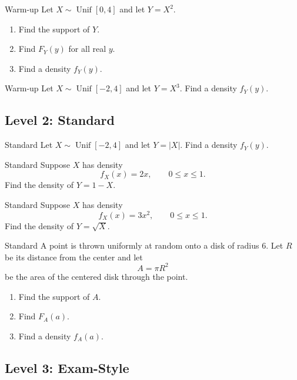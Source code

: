 \documentclass[12pt]{article}
\newcommand{\Unif}{\operatorname{Unif}}
\newcommand{\writespace}[1]{\vspace*{#1}}
\newcommand{\medws}{\writespace{1.8cm}}
\newcommand{\longws}{\writespace{2.8cm}}
\newcommand{\xlongws}{\writespace{4.1cm}}
\newcounter{problem}[section]
\begin{document}
\begin{practiceproblem}{Warm-up}
Let $X\sim\Unif[0,4]$ and let $Y=X^2$.
\begin{enumerate}
  \item Find the support of $Y$.
  \item Find $F_Y(y)$ for all real $y$.
  \item Find a density $f_Y(y)$.
\end{enumerate}
\end{practiceproblem}
\longws

\begin{practiceproblem}{Warm-up}
Let $X\sim\Unif[-2,4]$ and let $Y=X^3$. Find a density $f_Y(y)$.
\end{practiceproblem}
\longws

\subsection*{Level 2: Standard}

\begin{practiceproblem}{Standard}
Let $X\sim\Unif[-2,4]$ and let $Y=|X|$. Find a density $f_Y(y)$.
\end{practiceproblem}
\longws

\begin{practiceproblem}{Standard}
Suppose $X$ has density
\[
  f_X(x)=2x,\qquad 0\le x\le 1.
\]
Find the density of $Y=1-X$.
\end{practiceproblem}
\medws

\begin{practiceproblem}{Standard}
Suppose $X$ has density
\[
  f_X(x)=3x^2,\qquad 0\le x\le 1.
\]
Find the density of $Y=\sqrt X$.
\end{practiceproblem}
\medws

\begin{practiceproblem}{Standard}
A point is thrown uniformly at random onto a disk of radius $6$. Let $R$ be its distance from the center and let
\[
  A=\pi R^2
\]
be the area of the centered disk through the point.
\begin{enumerate}
  \item Find the support of $A$.
  \item Find $F_A(a)$.
  \item Find a density $f_A(a)$.
\end{enumerate}
\end{practiceproblem}
\xlongws

\subsection*{Level 3: Exam-Style}
\end{document}
